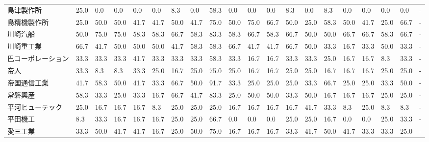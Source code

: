\begin{tabular}{llllllllllllllllllll}
島津製作所           &   25.0 &    0.0 &       0.0 &       0.0 &        0.0 &    8.3 &    0.0 &   58.3 &     0.0 &     0.0 &    0.0 &   8.3 &    0.0 &     8.3 &     0.0 &   0.0 &   0.0 &   0.0 &     - \\
島精機製作所          &   25.0 &   50.0 &      50.0 &      41.7 &       41.7 &   50.0 &   41.7 &   75.0 &    50.0 &    75.0 &   66.7 &  50.0 &   25.0 &    58.3 &    50.0 &  41.7 &  25.0 &  66.7 &     - \\
川崎汽船            &   50.0 &   75.0 &      75.0 &      58.3 &       58.3 &   66.7 &   58.3 &   83.3 &    58.3 &    66.7 &   58.3 &  66.7 &   50.0 &    50.0 &    66.7 &  66.7 &  58.3 &  66.7 &     - \\
川崎重工業           &   66.7 &   41.7 &      50.0 &      50.0 &       50.0 &   41.7 &   58.3 &   58.3 &    66.7 &    41.7 &   41.7 &  66.7 &   50.0 &    33.3 &    16.7 &  33.3 &  50.0 &  33.3 &     - \\
巴コーポレーション       &   33.3 &   33.3 &      33.3 &      41.7 &       33.3 &   33.3 &   33.3 &   58.3 &    33.3 &    16.7 &   16.7 &  33.3 &   33.3 &    25.0 &    16.7 &  16.7 &   8.3 &  33.3 &     - \\
帝人              &   33.3 &    8.3 &       8.3 &      33.3 &       25.0 &   16.7 &   25.0 &   75.0 &    25.0 &    16.7 &   16.7 &  25.0 &   25.0 &    16.7 &    16.7 &  16.7 &  25.0 &  25.0 &     - \\
帝国通信工業          &   41.7 &   58.3 &      50.0 &      41.7 &       33.3 &   66.7 &   50.0 &   91.7 &    33.3 &    25.0 &   25.0 &  25.0 &   33.3 &    66.7 &    25.0 &  25.0 &  33.3 &  50.0 &     - \\
常磐興産            &   58.3 &   33.3 &      25.0 &      33.3 &       16.7 &   66.7 &   41.7 &   83.3 &    25.0 &    50.0 &   50.0 &  33.3 &   50.0 &    16.7 &    16.7 &  16.7 &  25.0 &  25.0 &     - \\
平河ヒューテック        &   25.0 &   16.7 &      16.7 &      16.7 &        8.3 &   25.0 &   25.0 &   25.0 &    16.7 &    16.7 &   16.7 &  16.7 &   41.7 &    33.3 &     8.3 &  25.0 &   8.3 &   8.3 &     - \\
平田機工            &    8.3 &   33.3 &      16.7 &      16.7 &       16.7 &   25.0 &   25.0 &   66.7 &     0.0 &     0.0 &    0.0 &  25.0 &   25.0 &    16.7 &     0.0 &   0.0 &  25.0 &  33.3 &     - \\
愛三工業            &   33.3 &   50.0 &      41.7 &      41.7 &       16.7 &   25.0 &   50.0 &   75.0 &    16.7 &    16.7 &   16.7 &  33.3 &   41.7 &    50.0 &    41.7 &  33.3 &  33.3 &  25.0 &     - \\

\end{tabular}

